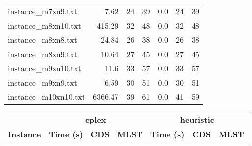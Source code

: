 \documentclass{article}
\begin{document}
\begin{center}
\begin{tabular}{lrrrrrr}
instance\_m7xn9.txt & 7.62 & 24 & 39
 & 0.0 & 24 & 39
\\
instance\_m8xn10.txt & 415.29 & 32 & 48
 & 0.0 & 32 & 48
\\
instance\_m8xn8.txt & 24.84 & 26 & 38
 & 0.0 & 26 & 38
\\
instance\_m8xn9.txt & 10.64 & 27 & 45
 & 0.0 & 27 & 45
\\
instance\_m9xn10.txt & 11.6 & 33 & 57
 & 0.0 & 33 & 57
\\
instance\_m9xn9.txt & 6.59 & 30 & 51
 & 0.0 & 30 & 51
\\
instance\_m10xn10.txt & 6366.47 & 39 & 61
 & 0.0 & 41 & 59
\\
\hline\end{tabular}
\end{center}
\newpage
\begin{center}
\renewcommand{\arraystretch}{1.4}
 \begin{tabular}{lrrrrrr}
	\hline
 & \multicolumn{3}{c}{\textbf{cplex}} & \multicolumn{3}{c}{\textbf{heuristic}}\\
\textbf{Instance}  & \textbf{Time (s)} & \textbf{CDS} & \textbf{MLST}   & \textbf{Time (s)} & \textbf{CDS} & \textbf{MLST}  \\\hline


\end{tabular}
\end{center}
\end{document}
